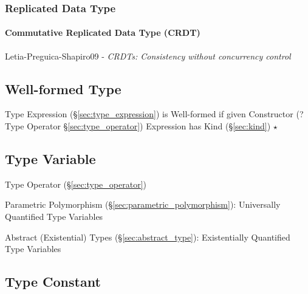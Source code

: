 \subsubsection{Replicated Data Type}\label{sec:replicated_data_type}

\paragraph{Commutative Replicated Data Type (CRDT)}\label{sec:crdt}\hfill

Letia-Preguica-Shapiro09 - \emph{CRDTs: Consistency without concurrency control}



\subsection{Well-formed Type}\label{sec:wellformed_type}


Type Expression (\S\ref{sec:type_expression}) is Well-formed if given
Constructor (? Type Operator \S\ref{sec:type_operator}) Expression has
Kind (\S\ref{sec:kind}) $\star$



\subsection{Type Variable}\label{sec:type_variable}

Type Operator (\S\ref{sec:type_operator})

Parametric Polymorphism (\S\ref{sec:parametric_polymorphism}):
Universally Quantified Type Variables

Abstract (Existential) Types (\S\ref{sec:abstract_type}):
Existentially Quantified Type Variables



\subsection{Type Constant}\label{sec:type_constant}

